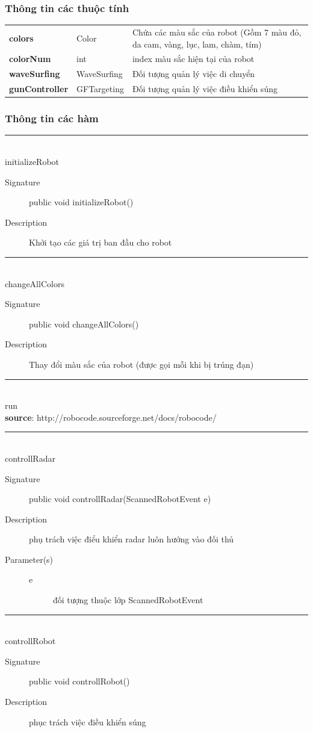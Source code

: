 \documentclass[14pt]{article}
\newcommand{\sep}{\rule{\textwidth}{0.007pt}\\}
\begin{document}
\subsubsection{Thông tin các thuộc tính}
\begin{tabular}{llp{9cm}}
\textbf{colors}&Color&Chứa các màu sắc của robot (Gồm 7 màu đỏ, da cam, vàng, lục, lam, chàm, tím)\\
\textbf{colorNum}&int&index màu sắc hiện tại của robot\\
\textbf{waveSurfing}&WaveSurfing&Đối tượng quản lý việc di chuyển\\
\textbf{gunController}&GFTargeting&Đối tượng quản lý việc điều khiển súng\\
\end{tabular}
\subsubsection{Thông tin các hàm}
\sep
initializeRobot
\begin{description}
	\item[Signature] public void initializeRobot()
	\item[Description] Khởi tạo các giá trị ban đầu cho robot
\end{description}
\sep
changeAllColors
\begin{description}
	\item[Signature] public void changeAllColors()
	\item[Description] Thay đổi màu sắc của robot (được gọi mỗi khi bị trúng đạn)
\end{description}
\sep
run\\
\textbf{source}: http://robocode.sourceforge.net/docs/robocode/\\
\sep
controllRadar
\begin{description}
	\item[Signature] public void controllRadar(ScannedRobotEvent e)
	\item[Description] phụ trách việc điểu khiển radar luôn hướng vào đối thủ
	\item[Parameter(s)]
	\begin{description}
		\item[e] đối tượng thuộc lớp ScannedRobotEvent
	\end{description}
\end{description}
\sep
controllRobot
\begin{description}
	\item[Signature] public void controllRobot()
	\item[Description] phục trách việc điều khiển súng
\end{description}
\end{document}
